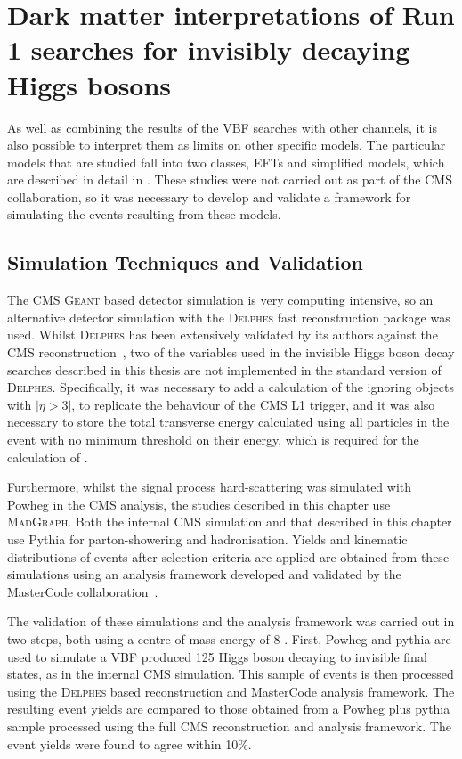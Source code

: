 \chapter{Dark matter interpretations of Run 1 searches for invisibly decaying Higgs bosons}
\label{chap:interp}
As well as combining the results of the \ac{VBF} searches with other channels, it is also possible to interpret them as limits on other specific models. The particular models that are studied fall into two classes, \ac{EFT}s and simplified models, which are described in detail in . These studies were not carried out as part of the CMS collaboration, so it was necessary to develop and validate a framework for simulating the events resulting from these models.


\section{Simulation Techniques and Validation}
\label{sec:dmval}
The CMS \textsc{Geant} based detector simulation is very computing intensive, so an alternative detector simulation with the \textsc{Delphes} fast reconstruction package was used. Whilst \textsc{Delphes} has been extensively validated by its authors against the CMS reconstruction~\cite{Favereau2014}, two of the variables used in the invisible Higgs boson decay searches described in this thesis are not implemented in the standard version of \textsc{Delphes}. Specifically, it was necessary to add a calculation of the \MET ignoring objects with $|\eta>3|$, to replicate the behaviour of the CMS \ac{L1} trigger, and it was also necessary to store the total transverse energy calculated using all particles in the event with no minimum threshold on their energy, which is required for the calculation of \METsig.

 Furthermore, whilst the signal process hard-scattering was simulated with Powheg in the CMS analysis, the studies described in this chapter use \textsc{MadGraph}. Both the internal CMS simulation and that described in this chapter use Pythia for parton-showering and hadronisation. Yields and kinematic distributions of events after selection criteria are applied are obtained from these simulations using an analysis framework developed and validated by the MasterCode collaboration~\cite{deVries:2015hva}.

The validation of these simulations and the analysis framework was carried out in two steps, both using a centre of mass energy of 8 \TeV. First, Powheg and pythia are used to simulate a \ac{VBF} produced 125 \GeV Higgs boson decaying to invisible final states, as in the internal CMS simulation. This sample of events is then processed using the \textsc{Delphes} based reconstruction and MasterCode analysis framework. The resulting event yields are compared to those obtained from a Powheg plus pythia sample processed using the full CMS reconstruction and analysis framework. The event yields were found to agree within 10\%.


